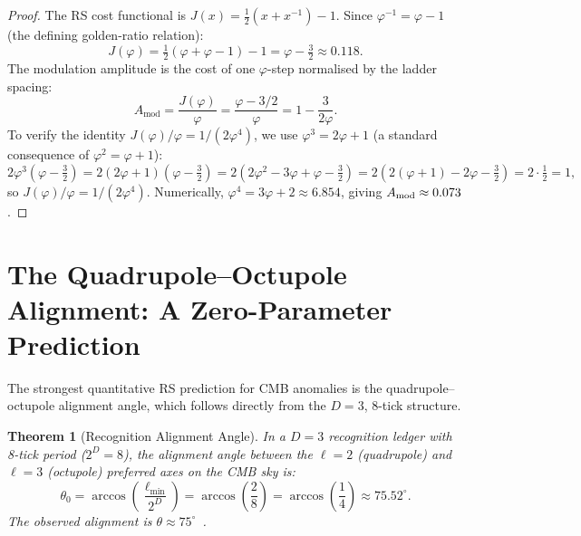 \documentclass[12pt,a4paper]{article}
\newtheorem{theorem}{Theorem}[section]
\theoremstyle{definition}
\theoremstyle{remark}
\begin{document}
\begin{proof}
The RS cost functional is $J(x) = \tfrac{1}{2}(x + x^{-1}) - 1$.
Since $\varphi^{-1} = \varphi - 1$ (the defining golden-ratio relation):
\[
  J(\varphi) = \tfrac{1}{2}(\varphi + \varphi - 1) - 1
  = \varphi - \tfrac{3}{2} \approx 0.118.
\]
The modulation amplitude is the cost of one $\varphi$-step normalised
by the ladder spacing:
\[
  A_{\mathrm{mod}} = \frac{J(\varphi)}{\varphi}
    = \frac{\varphi - 3/2}{\varphi}
    = 1 - \frac{3}{2\varphi}.
\]
To verify the identity $J(\varphi)/\varphi = 1/(2\varphi^4)$, we use
$\varphi^3 = 2\varphi + 1$ (a standard consequence of $\varphi^2 = \varphi + 1$):
\[
  2\varphi^3\!\left(\varphi - \tfrac{3}{2}\right)
  = 2(2\varphi+1)\!\left(\varphi - \tfrac{3}{2}\right)
  = 2\!\left(2\varphi^2 - 3\varphi + \varphi - \tfrac{3}{2}\right)
  = 2\!\left(2(\varphi+1) - 2\varphi - \tfrac{3}{2}\right)
  = 2 \cdot \tfrac{1}{2} = 1,
\]
so $J(\varphi)/\varphi = 1/(2\varphi^4)$.  Numerically,
$\varphi^4 = 3\varphi + 2 \approx 6.854$, giving
$A_{\rm mod} \approx 0.073$.
\end{proof}

\section{The Quadrupole--Octupole Alignment: A Zero-Parameter Prediction}
\label{sec:alignment}

The strongest quantitative RS prediction for CMB anomalies is the
quadrupole--octupole alignment angle, which follows directly from the
$D = 3$, 8-tick structure.

\begin{theorem}[Recognition Alignment Angle]
\label{thm:alignment}
In a $D=3$ recognition ledger with 8-tick period ($2^D = 8$), the
alignment angle between the $\ell = 2$ (quadrupole) and $\ell = 3$
(octupole) preferred axes on the CMB sky is:
\begin{equation}
  \theta_0 = \arccos\!\left(\frac{\ell_{\min}}{2^D}\right)
  = \arccos\!\left(\frac{2}{8}\right)
  = \arccos\!\left(\frac{1}{4}\right) \approx 75.52^\circ.
\end{equation}
The observed alignment is $\theta \approx 75^\circ$~\cite{Planck2020VII}.
\end{theorem}
\end{document}
